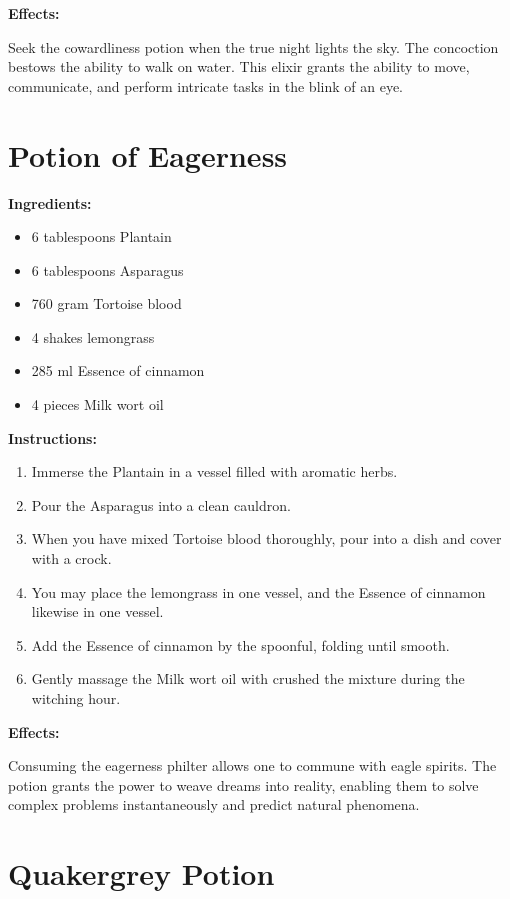\documentclass{article}
\begin{document}
\textbf{Effects:}

Seek the cowardliness potion when the true night lights the sky. The concoction bestows the ability to walk on water. This elixir grants the ability to move, communicate, and perform intricate tasks in the blink of an eye.

\newpage
\section*{Potion of Eagerness}

\textbf{Ingredients:}

\begin{itemize}
  \item 6 tablespoons Plantain
  \item 6 tablespoons Asparagus
  \item 760 gram Tortoise blood
  \item 4 shakes lemongrass
  \item 285 ml Essence of cinnamon
  \item 4 pieces Milk wort oil
\end{itemize}

\textbf{Instructions:}

\begin{enumerate}
  \item Immerse the Plantain in a vessel filled with aromatic herbs.
  \item Pour the Asparagus into a clean cauldron.
  \item When you have mixed Tortoise blood thoroughly, pour into a dish and cover with a crock.
  \item You may place the lemongrass in one vessel, and the Essence of cinnamon likewise in one vessel.
  \item Add the Essence of cinnamon by the spoonful, folding until smooth.
  \item Gently massage the Milk wort oil with crushed the mixture during the witching hour.
\end{enumerate}

\textbf{Effects:}

Consuming the eagerness philter allows one to commune with eagle spirits. The potion grants the power to weave dreams into reality, enabling them to solve complex problems instantaneously and predict natural phenomena.

\newpage
\section*{Quakergrey Potion}
\end{document}
